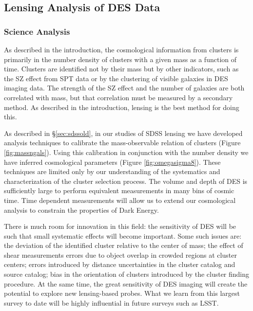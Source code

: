\documentclass[12pt]{article}
\begin{document}
\subsection{Lensing Analysis of DES Data} \label{sec:deslensing}

\subsubsection{Science Analysis}

As described in the introduction, the cosmological information from clusters is
primarily in the number density of clusters with a given mass as a function of
time.  Clusters are identified not by their mass but by other indicators, such
as the SZ effect from SPT data or by the clustering of visible galaxies in DES
imaging data.  The strength of the SZ effect and the number of galaxies are
both correlated with mass, but that correlation must be measured by a secondary
method.  As described in the introduction, lensing is the best method for doing
this.  

As described in \S\ref{sec:sdssold}, in our studies of SDSS lensing we have
developed analysis techniques to calibrate the mass-observable relation of
clusters (Figure \ref{fig:massngals}).  Using this calibration in conjunction
with the number density we have inferred cosmological parameters (Figure
\ref{fig:omegasigma8}).  These techniques are limited only by our understanding
of the systematics and characterization of the cluster selection process.  The
volume and depth of DES is sufficiently large to perform equivalent
measurements in many bins of cosmic time.  Time dependent measurements will
allow us to extend our cosmological analysis to constrain the properties of
Dark Energy.

There is much room for innovation in this field: the sensitivity of DES will be
such that small systematic effects will become important. Some such issues are:
the deviation of the identified cluster relative to the center of mass; the
effect of shear measurements errors due to object overlap in crowded regions at
cluster centers; errors introduced by distance uncertainties in the cluster
catalog and source catalog; bias in the orientation of clusters introduced by
the cluster finding procedure.  At the same time, the great sensitivity of DES
imaging will create the potential to explore new lensing-based probes.   What
we learn from this largest survey to date will be highly influential in future
surveys such as LSST.
\end{document}
